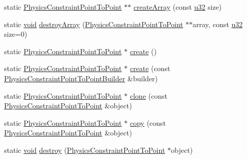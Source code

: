 \begin{DoxyCompactItemize}
\item 
static \mbox{\hyperlink{classnjli_1_1_physics_constraint_point_to_point}{Physics\+Constraint\+Point\+To\+Point}} $\ast$$\ast$ \mbox{\hyperlink{classnjli_1_1_physics_constraint_point_to_point_a267ed31f1fb0083be950281b9bea0385}{create\+Array}} (const \mbox{\hyperlink{_util_8h_a10e94b422ef0c20dcdec20d31a1f5049}{u32}} size)
\item 
static \mbox{\hyperlink{_thread_8h_af1e856da2e658414cb2456cb6f7ebc66}{void}} \mbox{\hyperlink{classnjli_1_1_physics_constraint_point_to_point_a44225e2e07a7792db8d50f752621c526}{destroy\+Array}} (\mbox{\hyperlink{classnjli_1_1_physics_constraint_point_to_point}{Physics\+Constraint\+Point\+To\+Point}} $\ast$$\ast$array, const \mbox{\hyperlink{_util_8h_a10e94b422ef0c20dcdec20d31a1f5049}{u32}} size=0)
\item 
static \mbox{\hyperlink{classnjli_1_1_physics_constraint_point_to_point}{Physics\+Constraint\+Point\+To\+Point}} $\ast$ \mbox{\hyperlink{classnjli_1_1_physics_constraint_point_to_point_a76dd0450878d6b069bf8533024255a6e}{create}} ()
\item 
static \mbox{\hyperlink{classnjli_1_1_physics_constraint_point_to_point}{Physics\+Constraint\+Point\+To\+Point}} $\ast$ \mbox{\hyperlink{classnjli_1_1_physics_constraint_point_to_point_a10657194042f642076ba63d6e34246a8}{create}} (const \mbox{\hyperlink{classnjli_1_1_physics_constraint_point_to_point_builder}{Physics\+Constraint\+Point\+To\+Point\+Builder}} \&builder)
\item 
static \mbox{\hyperlink{classnjli_1_1_physics_constraint_point_to_point}{Physics\+Constraint\+Point\+To\+Point}} $\ast$ \mbox{\hyperlink{classnjli_1_1_physics_constraint_point_to_point_aa68a1860b305a227593fe00442bb8846}{clone}} (const \mbox{\hyperlink{classnjli_1_1_physics_constraint_point_to_point}{Physics\+Constraint\+Point\+To\+Point}} \&object)
\item 
static \mbox{\hyperlink{classnjli_1_1_physics_constraint_point_to_point}{Physics\+Constraint\+Point\+To\+Point}} $\ast$ \mbox{\hyperlink{classnjli_1_1_physics_constraint_point_to_point_abcabf8d381d2c8c7adc66b3ad6a4eb08}{copy}} (const \mbox{\hyperlink{classnjli_1_1_physics_constraint_point_to_point}{Physics\+Constraint\+Point\+To\+Point}} \&object)
\item 
static \mbox{\hyperlink{_thread_8h_af1e856da2e658414cb2456cb6f7ebc66}{void}} \mbox{\hyperlink{classnjli_1_1_physics_constraint_point_to_point_a99954ab0a125669815fcde1d80868f87}{destroy}} (\mbox{\hyperlink{classnjli_1_1_physics_constraint_point_to_point}{Physics\+Constraint\+Point\+To\+Point}} $\ast$object)

\end{DoxyCompactItemize}
